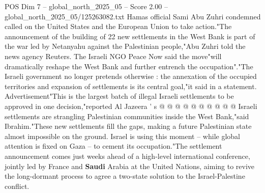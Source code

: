 \begin{textsample}{POS Dim 7 – global\_north\_2025\_05 – Score 2.00 – global\_north\_2025\_05/125263082.txt}
Hamas official Sami Abu Zuhri condemned called on the United States and the European Union to take action."The announcement of the building of 22 new settlements in the West Bank is part of the war led by Netanyahu against the Palestinian people,"Abu Zuhri told the news agency Reuters.
The Israeli NGO Peace Now said the move"will dramatically reshape the West Bank and further entrench the occupation"."The Israeli government no longer pretends otherwise : the annexation of the occupied territories and expansion of settlements is its central goal,"it said in a statement.
Advertisement"This is the largest batch of illegal Israeli settlements to be approved in one decision,"reported Al Jazeera ' s @ @ @ @ @ @ @ @ @ @ Israeli settlements are strangling Palestinian communities inside the West Bank,"said Ibrahim."These new settlements fill the gaps, making a future Palestinian state almost impossible on the ground.
Israel is using this moment -- while global attention is fixed on Gaza -- to cement its occupation."The settlement announcement comes just weeks ahead of a high-level international conference, jointly led by France and \textbf{Saudi} Arabia at the United Nations, aiming to revive the long-dormant process to agree a two-state solution to the Israel-Palestine conflict.

\end{textsample}
